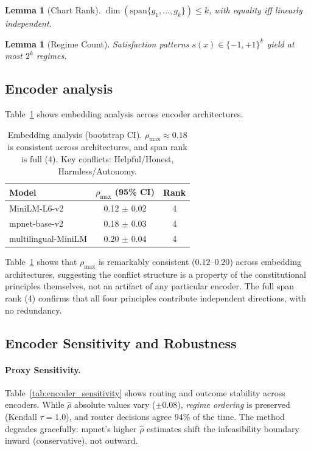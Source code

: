 \documentclass{article}
\theoremstyle{plain}
\newtheorem{lemma}[theorem]{Lemma}
\theoremstyle{definition}
\theoremstyle{remark}
\newcommand{\rhohat}{\hat{\rho}}
\begin{document}
\begin{lemma}[Chart Rank]\label{lem:chart_rank}
$\dim(\mathrm{span}\{g_1,\ldots,g_k\}) \le k$, with equality iff linearly independent.
\end{lemma}

\begin{lemma}[Regime Count]\label{lem:regime_count}
Satisfaction patterns $s(x) \in \{-1,+1\}^k$ yield at most $2^k$ regimes.
\end{lemma}

\subsection{Encoder analysis}

Table~\ref{tab:embedding_R} shows embedding analysis across encoder architectures.

\begin{table}[ht]
\centering
\small
\caption{Embedding analysis (bootstrap CI). $\rho_{\max} \approx 0.18$ is consistent across architectures, and span rank is full (4). Key conflicts: Helpful/Honest, Harmless/Autonomy.}
\label{tab:embedding_R}
\begin{tabular}{lcc}
\toprule
Model & $\rho_{\max}$ (95\% CI) & Rank \\
\midrule
MiniLM-L6-v2 & 0.12 $\pm$ 0.02 & 4 \\
mpnet-base-v2 & 0.18 $\pm$ 0.03 & 4 \\
multilingual-MiniLM & 0.20 $\pm$ 0.04 & 4 \\
\bottomrule
\end{tabular}
\end{table}

Table~\ref{tab:embedding_R} shows that $\rho_{\max}$ is remarkably consistent ($0.12$--$0.20$) across embedding architectures, suggesting the conflict structure is a property of the constitutional principles themselves, not an artifact of any particular encoder. The full span rank (4) confirms that all four principles contribute independent directions, with no redundancy.

\subsection{Encoder Sensitivity and Robustness}\label{app:encoder_robustness}\hypertarget{lim:assumptions}{}

\paragraph{Proxy Sensitivity.}
Table~\ref{tab:encoder_sensitivity} shows routing and outcome stability across encoders. While $\rhohat$ absolute values vary ($\pm$0.08), \emph{regime ordering} is preserved (Kendall $\tau = 1.0$), and router decisions agree 94\% of the time. The method degrades gracefully: mpnet's higher $\rhohat$ estimates shift the infeasibility boundary inward (conservative), not outward.
\end{document}
